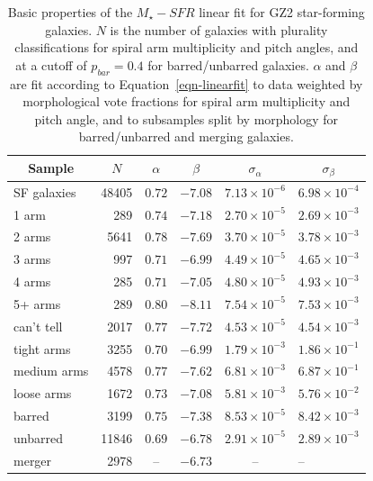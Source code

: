 \documentclass[useAMS,usenatbib]{mn2e}
\def\rr{\color{titlecol}}
\begin{document}
\begin{table} 
 \begin{tabular}{@{}lrcrcl}
 \hline
\multicolumn{1}{c}{Sample} &
\multicolumn{1}{c}{$N$} &
\multicolumn{1}{c}{$\alpha$} &
\multicolumn{1}{c}{$\beta$} &
\multicolumn{1}{c}{$\sigma_\alpha$} &
\multicolumn{1}{c}{$\sigma_\beta$} 
\\ 
\hline
\hline						
SF galaxies  & 48405  & $0.72$  & $-7.08$  &  $7.13\times10^{-6}$  & $6.98\times10^{-4}$  \\
\hline
1 arm        & 289    & $0.74$  & $-7.18$  &  $2.70\times10^{-5}$  & $2.69\times10^{-3}$  \\
2 arms       & 5641   & $0.78$  & $-7.69$  &  $3.70\times10^{-5}$  & $3.78\times10^{-3}$  \\
3 arms       & 997    & $0.71$  & $-6.99$  &  $4.49\times10^{-5}$  & $4.65\times10^{-3}$  \\
4 arms       & 285    & $0.71$  & $-7.05$  &  $4.80\times10^{-5}$  & $4.93\times10^{-3}$  \\
5+ arms      & 289    & $0.80$  & $-8.11$  &  $7.54\times10^{-5}$  & $7.53\times10^{-3}$  \\
can't tell   & 2017   & $0.77$  & $-7.72$  &  $4.53\times10^{-5}$  & $4.54\times10^{-3}$  \\
\hline
tight arms   & 3255   & $0.70$  & $-6.99$  &  $1.79\times10^{-3}$  & $1.86\times10^{-1}$  \\
medium arms  & 4578   & $0.77$  & $-7.62$  &  $6.81\times10^{-3}$  & $6.87\times10^{-1}$  \\
loose arms   & 1672   & $0.73$  & $-7.08$  &  $5.81\times10^{-3}$  & $5.76\times10^{-2}$  \\
\hline
barred       & 3199   & $0.75$  & $-7.38$  &  $8.53\times10^{-5}$  & $8.42\times10^{-3}$  \\
unbarred     & 11846  & $0.69$  & $-6.78$  &  $2.91\times10^{-5}$  & $2.89\times10^{-3}$  \\
\hline
merger       & 2978   & --      & $-6.73$  &  --                   & --                   \\
\hline
 \end{tabular}
\caption{Basic properties of the $M_\star-SFR$ linear fit for GZ2 star-forming galaxies. $N$ is the number of galaxies with plurality classifications for spiral arm multiplicity and pitch angles, and at a cutoff of $p_{bar}=0.4$ for barred/unbarred galaxies. {\rr $\alpha$ and $\beta$ are fit according to Equation~\ref{eqn-linearfit} to data weighted by morphological vote fractions for spiral arm multiplicity and pitch angle, and to subsamples split by morphology for barred/unbarred and merging galaxies.}\label{tbl-fits}}
\end{table}
\end{document}
